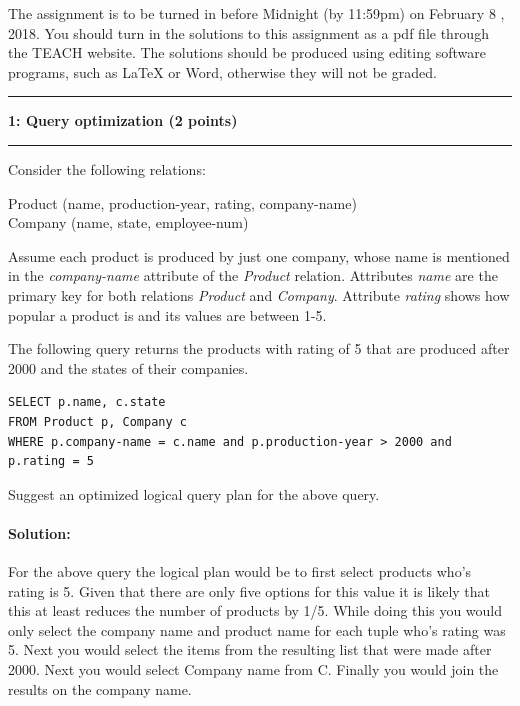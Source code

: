 \documentclass[11pt]{article}
\newcommand\question[2]{\vspace{.25in}\hrule\textbf{#1: #2}\vspace{.5em}\hrule\vspace{.10in}}
\begin{document}
\raggedright
\newcommand\NAME{Oregon State University}  %
\newcommand\ANDREWID{noelcket}     %
\newcommand\HWNUM{4}              %


The assignment is to be turned in before Midnight (by 11:59pm) on February 8 , 2018. 
You should turn in the solutions to this assignment as a pdf file through the TEACH website.
The solutions should be produced using editing software programs, such as LaTeX or Word, otherwise they will not be graded.


\question{1}{Query optimization  (2 points)}
Consider the following relations:


Product (name, production-year, rating, company-name)\\
Company (name, state, employee-num)

Assume each product is produced by just one company, whose name is mentioned in the 
{\it company-name} attribute of the {\it Product} relation. 
Attributes {\it name} are the primary key for both relations {\it Product} and {\it Company}.
Attribute {\it rating} shows how popular a product is and
its values are between 1-5. 


The following query returns the products with rating of 5 that are produced after 2000 and the states of their companies.\\

\begin{verbatim}
SELECT p.name, c.state
FROM Product p, Company c
WHERE p.company-name = c.name and p.production-year > 2000 and p.rating = 5
\end{verbatim}

Suggest an optimized logical query plan for the above query.\\

\paragraph{Solution:} \hfill \break
For the above query the logical plan would be to first select products who's rating is 5. Given that there are only five options for this value it is likely that this at least reduces the number of products by 1/5. While doing this you would only select the company name and product name for each tuple who's rating was 5. Next you would select the items from the resulting list that were made after 2000. Next you would select Company name from C. Finally you would join the results on the company name.\\
\end{document}

